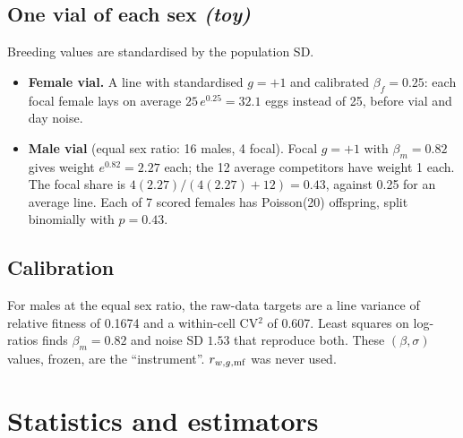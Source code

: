 \subsection{One vial of each sex \emph{(toy)}}
Breeding values are standardised by the population SD.
\begin{itemize}
\item \textbf{Female vial.} A line with standardised $g=+1$ and calibrated $\beta_f=0.25$: each focal female lays on average $25\,e^{0.25}=32.1$ eggs instead of 25, before vial and day noise.
\item \textbf{Male vial} (equal sex ratio: 16 males, 4 focal). Focal $g=+1$ with $\beta_m=0.82$ gives weight $e^{0.82}=2.27$ each; the 12 average competitors have weight 1 each. The focal share is $4(2.27)/(4(2.27)+12)=0.43$, against 0.25 for an average line. Each of 7 scored females has Poisson(20) offspring, split binomially with $p=0.43$.
\end{itemize}

\subsection{Calibration}
For males at the equal sex ratio, the raw-data targets are a line variance of relative fitness of 0.1674 and a within-cell CV$^2$ of 0.607. Least squares on log-ratios finds $\beta_m=0.82$ and noise SD $1.53$ that reproduce both. These $(\beta,\sigma)$ values, frozen, are the ``instrument''. $r_{w,g,\mathrm{mf}}$ was never used.

\section{Statistics and estimators}

